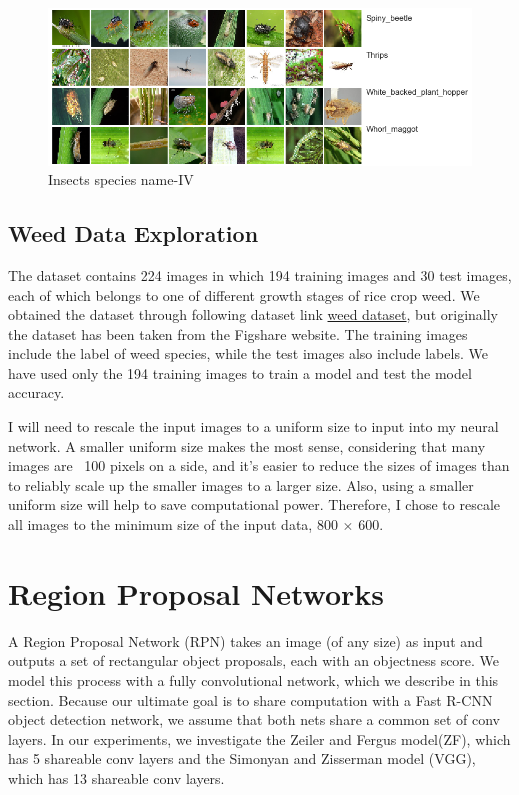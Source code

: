 \noindent
\begin{figure}
	\centering
	\includegraphics[width=\linewidth]{img13}
	\caption{Insects species name-IV}
	\label{fig:img13}
\end{figure}


\subsection{Weed Data Exploration }
The dataset contains 224 images in which 194 training images and 30 test images, each of which belongs to one of different growth stages of rice crop weed. We obtained the dataset through following dataset link \href{https://figshare.com/articles/rice_seedlings_and_weeds/7488830}{weed dataset},  but originally the dataset has been taken from the Figshare website. The training images include the label of weed species, while the test images also include labels. We have used only the 194 training images to train a model and test the model accuracy.



I will need to rescale the input images to a uniform size to input into my neural network. A smaller uniform size makes the most sense, considering that many images are ~100 pixels on a side, and it’s easier to reduce the sizes of images than to reliably scale up the smaller images to a larger size. Also, using a smaller uniform size will help to save computational power. Therefore, I chose to rescale all images to the minimum size of the input data, 800 $\times$ 600.

\section{Region Proposal Networks}

A Region Proposal Network (RPN) takes an image (of any size) as input and outputs a set of rectangular object proposals, each with an objectness score. We model this process with a fully convolutional network, which we describe in this section. Because our ultimate goal is to share computation with a Fast R-CNN object detection network, we assume that both nets share a
common set of conv layers. In our experiments, we investigate the Zeiler and Fergus model(ZF), which has 5 shareable conv layers and the Simonyan and Zisserman model (VGG), which
has 13 shareable conv layers.

